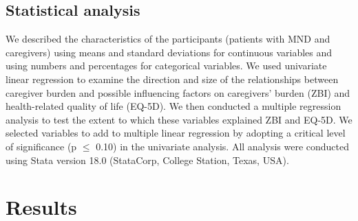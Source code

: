 \documentclass[12pt]{article}
\begin{document}
\subsection{Statistical analysis}
We described the characteristics of the participants (patients with MND and caregivers) using means and standard deviations for continuous variables and using numbers and percentages for categorical variables. We used univariate linear regression to examine the direction and size of the relationships between caregiver burden and possible influencing factors on  caregivers’ burden (ZBI) and health-related quality of life (EQ-5D). We then conducted a multiple regression analysis to test the extent to which these variables explained ZBI and EQ-5D. We selected variables to add to multiple linear regression by adopting a critical level of significance (p $\leq$ 0.10) in the univariate analysis.
All analysis were conducted using Stata version 18.0 (StataCorp, College Station, Texas, USA).

\section{Results}
\end{document}
